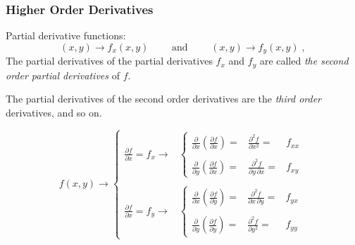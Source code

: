 \begin{frame}
  \frametitle{Higher Order Derivatives}
  Partial derivative functions:
%
$$(x,y) \to f_x(x,y) \qquad \text{ and } \qquad  (x,y) \to f_y(x,y)\; ,$$
%
\pause The partial derivatives of the partial derivatives $f_x$ and $f_y$ are called \emph{the second order partial derivatives} of $f$.

\pause The partial derivatives of the second order derivatives are the \emph{third order} derivatives, and so on.

$$f(x,y) \to \left\{ \begin{array}{cc}
  \frac{\partial f}{\partial x}=f_x  \to & \left\{ \begin{array}{ccc}
    \frac{\partial}{\partial x} \left( \frac{\partial f}{\partial x} \right) = & \frac{\partial^2 f}{\partial x^2} = & f_{xx} \\
    & & \\
    \frac{\partial}{\partial y} \left( \frac{\partial f}{\partial x} \right) = & \frac{\partial^2 f}{\partial y\,\partial x} = & f_{xy}
  \end{array} \right. \\
  & \\
  \frac{\partial f}{\partial x}=f_y  \to & \left\{ \begin{array}{ccc}
    \frac{\partial}{\partial x} \left( \frac{\partial f}{\partial y} \right) = & \frac{\partial^2 f}{\partial x\, \partial y} = & f_{yx} \\
    & & \\
    \frac{\partial}{\partial y} \left( \frac{\partial f}{\partial y} \right) = & \frac{\partial^2 f}{\partial y^2} = & f_{yy}
  \end{array} \right.
\end{array} \right.$$
\end{frame}